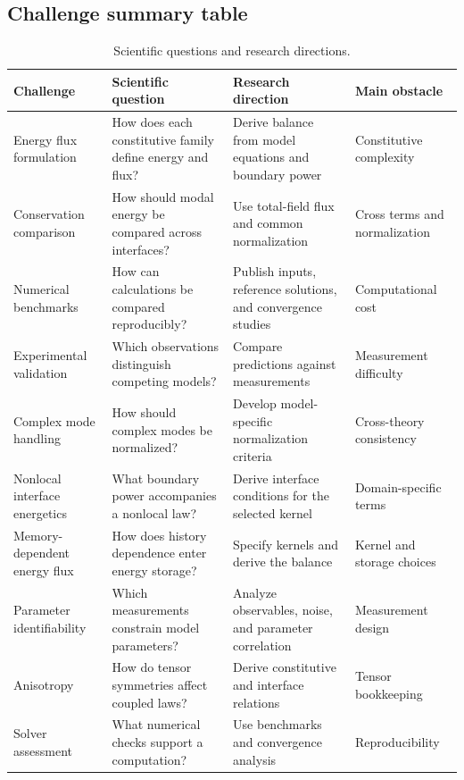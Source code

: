 \subsection{Challenge summary table}
\label{sec:15.11}

\begin{table}[htbp]
\centering
\small
\caption{Scientific questions and research directions.}
\label{tab:challenges_summary}
\begin{tabularx}{\textwidth}{@{}p{2.4cm}XXX@{}}
\toprule
\textbf{Challenge} & \textbf{Scientific question} & \textbf{Research direction} & \textbf{Main obstacle} \\
\midrule
Energy flux formulation & How does each constitutive family define energy and flux? & Derive balance from model equations and boundary power & Constitutive complexity \\
Conservation comparison & How should modal energy be compared across interfaces? & Use total-field flux and common normalization & Cross terms and normalization \\
Numerical benchmarks & How can calculations be compared reproducibly? & Publish inputs, reference solutions, and convergence studies & Computational cost \\
Experimental validation & Which observations distinguish competing models? & Compare predictions against measurements & Measurement difficulty \\
Complex mode handling & How should complex modes be normalized? & Develop model-specific normalization criteria & Cross-theory consistency \\
Nonlocal interface energetics & What boundary power accompanies a nonlocal law? & Derive interface conditions for the selected kernel & Domain-specific terms \\
Memory-dependent energy flux & How does history dependence enter energy storage? & Specify kernels and derive the balance & Kernel and storage choices \\
Parameter identifiability & Which measurements constrain model parameters? & Analyze observables, noise, and parameter correlation & Measurement design \\
Anisotropy & How do tensor symmetries affect coupled laws? & Derive constitutive and interface relations & Tensor bookkeeping \\
Solver assessment & What numerical checks support a computation? & Use benchmarks and convergence analysis & Reproducibility \\
\bottomrule
\end{tabularx}
\end{table}

